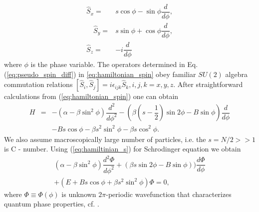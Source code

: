 \documentclass[aps, pre, preprint, groupedaddress, superscriptaddress, showkeys, showpacs] {revtex4-1}
\DeclarePairedDelimiter\ket{\lvert}{\rangle}
\newcommand{\red}{\color{red}}
\begin{document}
% 
\begin{subequations}
\begin{align}
\hat{S}_x = & s \cos{\phi} - \sin{\phi} \dfrac{d}{d \phi}, \\
\quad \hat{S}_y = & s \sin{\phi} + \cos{\phi} \dfrac{d}{d \phi}, \\
\hat{S}_z = & -i\dfrac{d}{d \phi}
\end{align}
\label{eq:pseudo_spin_diff}
\end{subequations}
%
where  $\phi$ is the phase variable.
The operators determined in Eq. (\ref{eq:pseudo_spin_diff}) in \eqref{eq:hamiltonian_spin}
 obey familiar $SU(2)$ algebra commutation relations $[\hat{S}_i, \hat{S}_j] = i\epsilon_{ijk}\hat{S}_k,  i,j,k=x,y,z$.
After straightforward calculations from (\ref{eq:hamiltonian_spin}) one can obtain
%
\begin{equation}
\begin{array}{lcl}
H & = & -(\alpha - \beta \sin^2 \phi) \dfrac{d^2}{d \phi^2} - (\beta(s-\dfrac{1}{2})\sin{2\phi} - B\sin{\phi}) \dfrac{d}{d \phi} \\
&& - Bs \cos \phi - \beta s^2 \sin^2 \phi - \beta s \cos^2 \phi.
\end{array}
\label{eq:hamiltinian_s}
\end{equation}
%
We also assume macroscopically large number of particles, i.e. the $s = N/2 >> 1$ is C - number. Using (\ref{eq:hamiltinian_s})  for Schrodinger equation we obtain   
%
\begin{equation}
\begin{array}{l}
(\alpha - \beta \sin^2 \phi) \dfrac{d^2 \Phi}{d \phi^2} + (\beta s\sin{2\phi}-B\sin{\phi})) \dfrac{d \Phi}{d \phi} \\
+ (E + B s \cos \phi + \beta s^2 \sin^2 \phi) \Phi = 0,
\end{array}
\label{eq:schrodinger}
\end{equation}
%
where $\Phi \equiv \Phi(\phi)$ is unknown $2\pi$-periodic wavefunction that characterizes quantum phase properties, cf. \cite{Anglin}.
%
%
%
\end{document}
